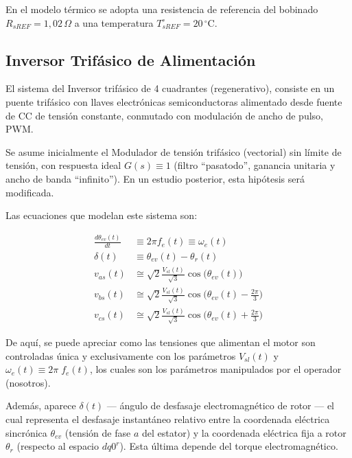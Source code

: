 \documentclass[blue,fullpaper]{ludusofficial}  %
\begin{document}
En el modelo térmico se adopta una resistencia de referencia del bobinado $R_{sREF}=1{,}02\,\Omega$ a una temperatura $T_{sREF}^{\circ}=20\,^\circ\mathrm{C}$.

\subsection{Inversor Trifásico de Alimentación}
El sistema del Inversor trifásico de 4 cuadrantes (regenerativo), consiste en un puente trifásico con llaves electrónicas semiconductoras  alimentado desde fuente de CC de tensión constante, conmutado con modulación de ancho de pulso, PWM.

Se asume inicialmente el Modulador de tensión trifásico (vectorial) sin límite de tensión, con respuesta ideal $G(s) \equiv 1$ (filtro “pasatodo”, ganancia unitaria y ancho de banda “infinito”). En un estudio posterior, esta hipótesis será modificada.

Las ecuaciones que modelan este sistema son:

\begin{align}
    \frac{d\theta_{ev}(t)}{dt}  & \equiv 2\pi f_{e}(t) \equiv \omega_{e}(t)
\label{eq:angulo-inversor} \\
    \delta(t)  & \equiv \theta_{ev}(t) - \theta_{r}(t)
\label{eq:desfase-inversor} \\
    v_{as}(t)  & \cong \sqrt{ 2 } \frac{V_{sl}(t)}{\sqrt{ 3 }} \cos \Big( \theta_{ev}(t) \Big)
\label{eq:tension-fase-a} \\
    v_{bs}(t) &  \cong \sqrt{ 2 } \frac{V_{sl}(t)}{\sqrt{ 3 }} \cos \Big( \theta_{ev}(t) - \frac{2\pi}{3} \Big)
\label{eq:tension-fase-b} \\
    v_{cs}(t) &  \cong \sqrt{ 2 } \frac{V_{sl}(t)}{\sqrt{ 3 }} \cos \Big( \theta_{ev}(t) + \frac{2\pi}{3}  \Big)
\label{eq:tension-fase-c}
\end{align}

De aquí, se puede apreciar como las tensiones que alimentan el motor son controladas única y exclusivamente con los parámetros $V_{sl}(t)$ y $\omega_e(t)\equiv 2\pi \; f_e(t)$, los cuales son los parámetros manipulados por el operador (nosotros).

Además, aparece $\delta(t)$ — ángulo de desfasaje electromagnético de rotor — el cual representa el desfasaje instantáneo relativo entre la coordenada eléctrica sincrónica $\theta_{ev}$ (tensión de fase $a$ del estator) y la coordenada eléctrica fija a rotor $\theta_r$ (respecto al espacio $dq0^r$). Esta última depende del torque electromagnético.
\end{document}
